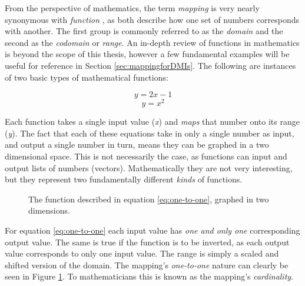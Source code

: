 From the perspective of mathematics, the term \emph{mapping} is very nearly synonymous with \emph{function} \cite{native_set_theory}, as both describe how one set of numbers corresponds with another. The first group is commonly referred to as the \emph{domain} and the second as the \emph{codomain} or \emph{range}. An in-depth review of functions in mathematics is beyond the scope of this thesis, however a few fundamental examples will be useful for reference in Section \ref{sec:mappingforDMIs}. The following are instances of two basic types of mathematical functions:

\begin{equation} y = 2x - 1 \label{eq:one-to-one} \end{equation} 
\begin{equation} y = x^2  \label{eq:many-to-one}  \end{equation}

Each function takes a single input value (\emph{x}) and \emph{maps} that number onto its range (\emph{y}). 
The fact that each of these equations take in only a single number as input, and output a single number in turn, means they can be graphed in a two dimensional space. This is not necessarily the case, as functions can input and output lists of numbers (vectors). Mathematically they are not very interesting, but they represent two fundamentally different \emph{kinds} of functions.

\begin{figure}[h]
	\centering
\caption{The function described in equation \ref{eq:one-to-one}, graphed in two dimensions.}
\label{fig:one-to-one_graph}
\end{figure}

For equation \ref{eq:one-to-one} each input value has \emph{one and only one} corresponding output value. The same is true if the function is to be inverted, as each output value corresponds to only one input value. The range is simply a scaled and shifted version of the domain. The mapping's \emph{one-to-one} nature can clearly be seen in Figure \ref{fig:one-to-one_graph}. To mathematicians this is known as the mapping's \emph{cardinality}.

